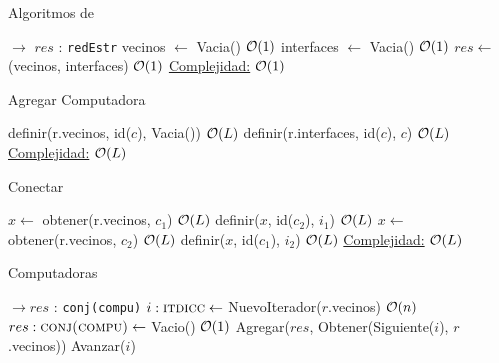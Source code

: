 \begin{Algoritmos}


\begin{algorithm}
  \caption{Algoritmos de }
\begin{algorithmic}[1]
   $\to$ $res$ : \texttt{redEstr}
  \State vecinos $\gets$ Vacia() \Comment $\mathcal{O}(1)$
  \State interfaces $\gets$ Vacia() \Comment $\mathcal{O}(1)$
  \State $res \gets$ (vecinos, interfaces) \Comment $\mathcal{O}(1)$
  \EndProcedure
  \underline{Complejidad:} $\mathcal{O}(1)$
\end{algorithmic}
\end{algorithm}


\begin{algorithm}
\caption{Agregar Computadora}
\begin{algorithmic}[1]
  \State definir(r.vecinos, id($c$), Vacia()) \Comment $\mathcal{O}(L)$
  \State definir(r.interfaces, id($c$), $c$) \Comment $\mathcal{O}(L)$
 \EndProcedure
 \underline{Complejidad:} $\mathcal{O}(L)$
\end{algorithmic}
\end{algorithm}


\begin{algorithm}
\caption{Conectar}
\begin{algorithmic}[1]
  \State $x \gets$ obtener(r.vecinos, $c_1$) \Comment $\mathcal{O}(L)$
  \State definir($x$, id($c_2$), $i_1$) \Comment $\mathcal{O}(L)$
  \State $x \gets$ obtener(r.vecinos, $c_2$) \Comment $\mathcal{O}(L)$
  \State definir($x$, id($c_1$), $i_2$) \Comment $\mathcal{O}(L)$
 \EndProcedure
 \underline{Complejidad:} $\mathcal{O}(L)$
\end{algorithmic}
\end{algorithm}



\begin{algorithm}
\caption{Computadoras}
\begin{algorithmic}[1]
   $\to res$ : \texttt{conj(compu)}
  \State $i :\textsc{itdicc} \gets$ NuevoIterador($r$.vecinos) \Comment $\mathcal{O}(n)$
  \State $res :\textsc{conj(compu)} \gets$ Vacio() \Comment $\mathcal{O}(1)$
    \State Agregar($res$, Obtener(Siguiente($i$), $r$.vecinos))
    \State Avanzar($i$)
  \EndWhile
 \EndProcedure
\end{algorithmic}
\end{algorithm}



\end{Algoritmos}
